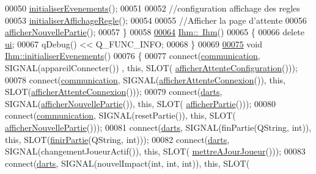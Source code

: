\begin{DoxyCode}
00050     \hyperlink{class_ihm_a9df8990148a898f728304a4e789be2a6}{initialiserEvenements}();
00051 
00052     \textcolor{comment}{//configuration affichage des regles}
00053     \hyperlink{class_ihm_a97b1938c38eef2427b5cf2326feeef3d}{initialiserAffichageRegle}();
00054 
00055     \textcolor{comment}{//Afficher la page d'attente}
00056     \hyperlink{class_ihm_a90c6b5c75d3903f50ea7c00b8093c686}{afficherNouvellePartie}();
00057 \}
00058 
\hyperlink{class_ihm_add292ea9005bacd1de44dd1ed9ede5b9}{00064} \hyperlink{class_ihm_add292ea9005bacd1de44dd1ed9ede5b9}{Ihm::~Ihm}()
00065 \{
00066     \textcolor{keyword}{delete} \hyperlink{class_ihm_a0ac5f47856566ceeeca1720109bf70ea}{ui};
00067     qDebug() << Q\_FUNC\_INFO;
00068 \}
00069 
\hyperlink{class_ihm_a9df8990148a898f728304a4e789be2a6}{00075} \textcolor{keywordtype}{void} \hyperlink{class_ihm_a9df8990148a898f728304a4e789be2a6}{Ihm::initialiserEvenements}()
00076 \{
00077     connect(\hyperlink{class_ihm_a2f3d4781795781a840786cd8c2233899}{communication}, SIGNAL(appareilConnecter()) , \textcolor{keyword}{this}, SLOT(
      \hyperlink{class_ihm_a3d1f9b366774b538acfcf66195c3c81a}{afficherAttenteConfiguration}()));
00078     connect(\hyperlink{class_ihm_a2f3d4781795781a840786cd8c2233899}{communication}, SIGNAL(\hyperlink{class_ihm_a46f511e7be2c138a8fe2dec17d6bb2bf}{afficherAttenteConnexion}()), \textcolor{keyword}{this}, 
      SLOT(\hyperlink{class_ihm_a46f511e7be2c138a8fe2dec17d6bb2bf}{afficherAttenteConnexion}()));
00079     connect(\hyperlink{class_ihm_a2a0f54d33f4d6b2531ec2190c4a2356e}{darts}, SIGNAL(\hyperlink{class_ihm_a90c6b5c75d3903f50ea7c00b8093c686}{afficherNouvellePartie}()), \textcolor{keyword}{this}, SLOT(
      \hyperlink{class_ihm_a3b26fb5299eba99925d005ea39eef9da}{afficherPartie}()));
00080     connect(\hyperlink{class_ihm_a2f3d4781795781a840786cd8c2233899}{communication}, SIGNAL(resetPartie()), \textcolor{keyword}{this}, SLOT(
      \hyperlink{class_ihm_a90c6b5c75d3903f50ea7c00b8093c686}{afficherNouvellePartie}()));
00081     connect(\hyperlink{class_ihm_a2a0f54d33f4d6b2531ec2190c4a2356e}{darts}, SIGNAL(finPartie(QString, \textcolor{keywordtype}{int})), \textcolor{keyword}{this}, SLOT(\hyperlink{class_ihm_a0c7ee6ee6313db87c7cc34dbd57dd57d}{finirPartie}(QString, \textcolor{keywordtype}{int})));
00082     connect(\hyperlink{class_ihm_a2a0f54d33f4d6b2531ec2190c4a2356e}{darts}, SIGNAL(changementJoueurActif()), \textcolor{keyword}{this}, SLOT(
      \hyperlink{class_ihm_aaeeb08a39f940e58da194768763dc00b}{mettreAJourJoueur}()));
00083     connect(\hyperlink{class_ihm_a2a0f54d33f4d6b2531ec2190c4a2356e}{darts}, SIGNAL(nouvelImpact(\textcolor{keywordtype}{int}, \textcolor{keywordtype}{int}, \textcolor{keywordtype}{int})), \textcolor{keyword}{this}, SLOT(

\end{DoxyCode}
